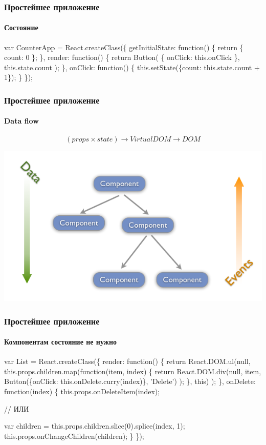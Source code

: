 \documentclass[10pt,utf8]{beamer}
\begin{document}
\begin{frame}[fragile]
  \frametitle{Простейшее приложение}
  \framesubtitle{Состояние}

  \begin{semiverbatim}
    var CounterApp = React.createClass(\{
      getInitialState: function() \{
        return \{ \alert{count: 0} \};
      \},
      render: function() \{
        return Button(
          \{ onClick: this.onClick \},
          \alert{this.state.count}
        );
      \},
      onClick: function() \{
        this.setState(\{\alert{count: this.state.count + 1}\});
      \}
    \});
  \end{semiverbatim}
\end{frame}

\begin{frame}[fragile]
  \frametitle{Простейшее приложение}
  \framesubtitle{Data flow}

  $$ (props \times state) \rightarrow Virtual DOM \rightarrow DOM $$

  \includegraphics[scale=0.5]{data-event-flow.png}
\end{frame}

\begin{frame}[fragile]
  \frametitle{Простейшее приложение}
  \framesubtitle{Компонентам состояние не нужно}

  \fontsize{9pt}{9.2}\selectfont

  \begin{semiverbatim}
    var List = React.createClass(\{
      render: function() \{
        return React.DOM.ul(null,
          this.props.children.map(function(item, index) \{
            return React.DOM.div(null,
              item,
              Button(\{onClick: this.onDelete.curry(index)\}, 'Delete')
            );
          \}, this)
        );
      \},
      onDelete: function(index) \{
        this.props.onDeleteItem(index);

        // ИЛИ

        var children = this.props.children.slice(0).splice(index, 1);
        this.props.onChangeChildren(children);
      \}
    \});
  \end{semiverbatim}
\end{frame}
\end{document}
